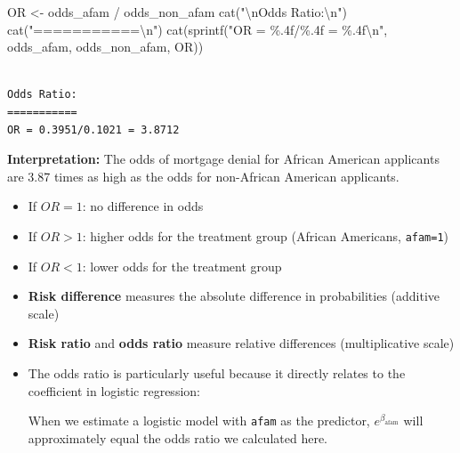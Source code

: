 \documentclass[
  12pt,
  a4paper,
]{scrbook}
\newenvironment{Shaded}{\begin{snugshade}}{\end{snugshade}}
\newcommand{\FunctionTok}[1]{\textcolor[rgb]{0.28,0.35,0.67}{#1}}
\newcommand{\NormalTok}[1]{\textcolor[rgb]{0.00,0.23,0.31}{#1}}
\newcommand{\OtherTok}[1]{\textcolor[rgb]{0.00,0.23,0.31}{#1}}
\newcommand{\SpecialCharTok}[1]{\textcolor[rgb]{0.37,0.37,0.37}{#1}}
\newcommand{\StringTok}[1]{\textcolor[rgb]{0.13,0.47,0.30}{#1}}
\providecommand{\tightlist}{%
  \setlength{\itemsep}{0pt}\setlength{\parskip}{0pt}}
\renewcommand{\tightlist}{\setlength{\itemsep}{0.5\baselineskip}\setlength{\parskip}{0.2\baselineskip}}
\theoremstyle{plain}
\theoremstyle{definition}
\theoremstyle{remark}
\begin{document}
\begin{enumerate}
\begin{Shaded}
\begin{Highlighting}[]
\NormalTok{OR }\OtherTok{\textless{}{-}}\NormalTok{ odds\_afam }\SpecialCharTok{/}\NormalTok{ odds\_non\_afam}
\FunctionTok{cat}\NormalTok{(}\StringTok{"}\SpecialCharTok{\textbackslash{}n}\StringTok{Odds Ratio:}\SpecialCharTok{\textbackslash{}n}\StringTok{"}\NormalTok{)}
\FunctionTok{cat}\NormalTok{(}\StringTok{"===========}\SpecialCharTok{\textbackslash{}n}\StringTok{"}\NormalTok{)}
\FunctionTok{cat}\NormalTok{(}\FunctionTok{sprintf}\NormalTok{(}\StringTok{"OR = \%.4f/\%.4f = \%.4f}\SpecialCharTok{\textbackslash{}n}\StringTok{"}\NormalTok{, odds\_afam, odds\_non\_afam, OR))}
\end{Highlighting}
\end{Shaded}

\begin{verbatim}

Odds Ratio:
===========
OR = 0.3951/0.1021 = 3.8712
\end{verbatim}

  \textbf{Interpretation:} The odds of mortgage denial for African
  American applicants are 3.87 times as high as the odds for non-African
  American applicants.

  \begin{itemize}
  \tightlist
  \item
    If \(OR = 1\): no difference in odds
  \item
    If \(OR > 1\): higher odds for the treatment group (African
    Americans, \texttt{afam=1})
  \item
    If \(OR < 1\): lower odds for the treatment group
  \end{itemize}
\end{enumerate}

\begin{tcolorbox}[enhanced jigsaw, arc=.35mm, bottomrule=.15mm, bottomtitle=1mm, breakable, colback=white, colbacktitle=quarto-callout-note-color!10!white, colframe=quarto-callout-note-color-frame, coltitle=black, left=2mm, leftrule=.75mm, opacityback=0, opacitybacktitle=0.6, rightrule=.15mm, title=\textcolor{quarto-callout-note-color}{\faInfo}\hspace{0.5em}{Important Distinction}, titlerule=0mm, toprule=.15mm, toptitle=1mm]

\begin{itemize}
\item
  \textbf{Risk difference} measures the absolute difference in
  probabilities (additive scale)
\item
  \textbf{Risk ratio} and \textbf{odds ratio} measure relative
  differences (multiplicative scale)
\item
  The odds ratio is particularly useful because {it directly relates to
  the coefficient in logistic regression}:

  When we estimate a logistic model with \texttt{afam} as the predictor,
  \(e^{\beta_{\text{afam}}}\) will approximately equal the odds ratio we
  calculated here.
\end{itemize}

\end{tcolorbox}
\end{document}
